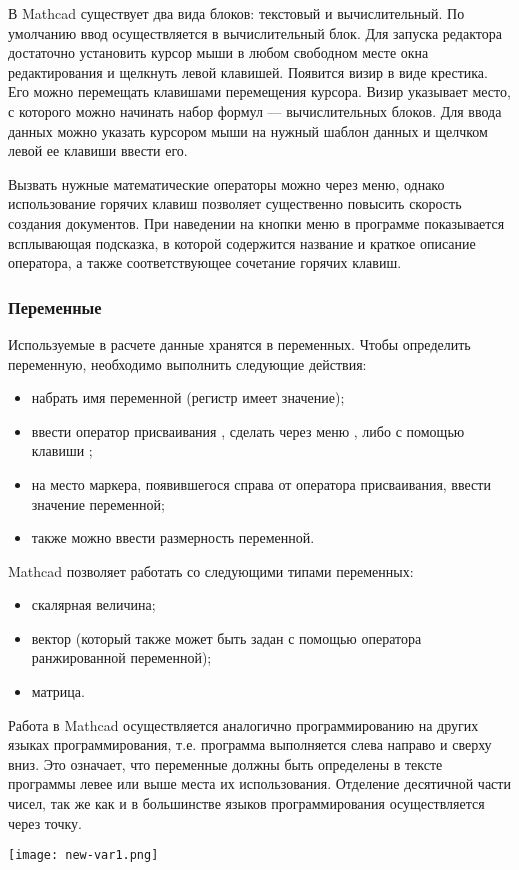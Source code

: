В Mathcad существует два вида блоков: текстовый и вычислительный. По умолчанию ввод осуществляется в вычислительный блок. Для запуска редактора достаточно установить курсор мыши в любом свободном месте окна редактирования и щелкнуть левой клавишей. Появится визир в виде крестика. Его можно перемещать клавишами перемещения курсора. Визир указывает место, с которого можно начинать набор формул --- вычислительных блоков. Для ввода данных можно указать курсором мыши на нужный шаблон данных и щелчком левой ее клавиши ввести его.

Вызвать нужные математические операторы можно через меню, однако использование горячих клавиш позволяет существенно повысить скорость создания документов. При наведении на кнопки меню в программе показывается всплывающая подсказка, в которой содержится название и краткое описание оператора, а также соответствующее сочетание горячих клавиш.

\subsubsection*{Переменные}
Используемые в расчете данные хранятся в переменных. Чтобы определить переменную, необходимо выполнить следующие действия:
\begin{itemize}
	\item набрать имя переменной (регистр имеет значение);
	\item ввести оператор присваивания \mc{:=}, сделать через меню  ,  либо с помощью клавиши \keys{:};
	\item на место маркера, появившегося справа от оператора присваивания, ввести значение переменной;
	\item также можно ввести размерность переменной.
\end{itemize}
Mathcad позволяет работать со следующими типами переменных:
\begin{itemize}
\item скалярная величина;
\item вектор (который также может быть задан с помощью оператора ранжированной переменной);
\item матрица.
\end{itemize}

Работа в Mathcad осуществляется аналогично программированию на других языках программирования, т.е. программа выполняется слева направо и сверху вниз. Это означает, что переменные должны быть определены в тексте программы левее или выше места их использования. Отделение десятичной части чисел, так же как и в большинстве языков программирования осуществляется через точку.
\begin{center}
	\texttt{[image: new-var1.png]}
\end{center}

